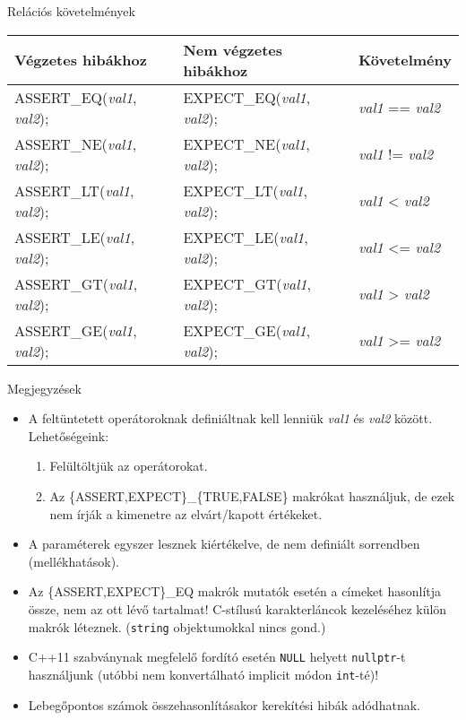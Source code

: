 \begin{frame}
  \begin{center}
    Relációs követelmények
    \medskip\\
    \begin{tabular}{lll}
      \textbf{Végzetes hibákhoz} & \textbf{Nem végzetes hibákhoz} & \textbf{Követelmény}\\ \hline
      ASSERT\_EQ(\emph{val1}, \emph{val2}); & EXPECT\_EQ(\emph{val1}, \emph{val2}); & \emph{val1} == \emph{val2}\\
      ASSERT\_NE(\emph{val1}, \emph{val2}); & EXPECT\_NE(\emph{val1}, \emph{val2}); & \emph{val1} != \emph{val2}\\
      ASSERT\_LT(\emph{val1}, \emph{val2}); & EXPECT\_LT(\emph{val1}, \emph{val2}); & \emph{val1} < \emph{val2}\\
      ASSERT\_LE(\emph{val1}, \emph{val2}); & EXPECT\_LE(\emph{val1}, \emph{val2}); & \emph{val1} <= \emph{val2}\\
      ASSERT\_GT(\emph{val1}, \emph{val2}); & EXPECT\_GT(\emph{val1}, \emph{val2}); & \emph{val1} > \emph{val2}\\
      ASSERT\_GE(\emph{val1}, \emph{val2}); & EXPECT\_GE(\emph{val1}, \emph{val2}); & \emph{val1} >= \emph{val2}
    \end{tabular}
  \end{center}
\end{frame}

\begin{frame}
  Megjegyzések
  \begin{itemize}
    \item A feltüntetett operátoroknak definiáltnak kell lenniük \emph{val1} és \emph{val2} között. Lehetőségeink:
    \begin{enumerate}
      \item Felültöltjük az operátorokat.
      \item Az \{ASSERT,EXPECT\}\_\{TRUE,FALSE\} makrókat használjuk, de ezek nem írják a kimenetre az elvárt/kapott 
értékeket.
    \end{enumerate}
    \item A paraméterek egyszer lesznek kiértékelve, de nem definiált sorrendben (mellékhatások).
    \item Az \{ASSERT,EXPECT\}\_EQ makrók mutatók esetén a címeket hasonlítja össze, nem az ott lévő tartalmat! C-stílusú 
karakterláncok kezeléséhez külön makrók léteznek. (\texttt{string} objektumokkal nincs gond.)
    \item C++11 szabványnak megfelelő fordító esetén \texttt{NULL} helyett \texttt{nullptr}-t használjunk 
(utóbbi nem konvertálható implicit módon \texttt{int}-té)!
    \item Lebegőpontos számok összehasonlításakor kerekítési hibák adódhatnak.
  \end{itemize}
\end{frame}
